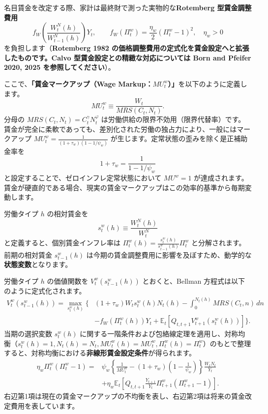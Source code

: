 \documentclass[
  japanese,
  lualatex,
  ja=standard,
  12pt,
  a4paper]{ltjsarticle}
\begin{document}
名目賃金を改定する際、家計は最終財で測った実物的な\textbf{Rotemberg
型賃金調整費用} \[
f_W\left(\frac{W_t^N(h)}{W_{t-1}^N(h)}\right)Y_t,
\qquad
f_W(\Pi_t^w)=\frac{\eta_w}{2}(\Pi_t^w-1)^2,
\quad
\eta_w>0
\] を負担します（\textbf{Rotemberg 1982
の価格調整費用の定式化を賃金設定へと拡張したものです。Calvo
型賃金設定との精緻な対応については Born and Pfeifer 2020, 2025
を参照してください}）。

ここで、\textbf{「賃金マークアップ（Wage
Markup：\(MU_t^w\)）」}を以下のように定義します。 \[
MU_t^w
\equiv
\frac{W_t}{MRS(C_t,N_t)}.
\] 分母の \(MRS(C_t, N_t) = C_t^\gamma N_t^\varphi\)
は労働供給の限界不効用（限界代替率）です。賃金が完全に柔軟であっても、差別化された労働の独占力により、一般にはマークアップ
\(MU_t^w = \frac{1}{(1+\tau_w)(1-1/\psi_w)}\)
が生じます。定常状態の歪みを除く是正補助金率を \[
1+\tau_w=\frac{1}{1-1/\psi_w}
\] と設定することで、ゼロインフレ定常状態において \(MU^w=1\)
が達成されます。賃金が硬直的である場合、現実の賃金マークアップはこの効率的基準から毎期変動します。

労働タイプ \(h\) の相対賃金を \[
s_t^w(h)\equiv \frac{W_t^N(h)}{W_t^N}
\] と定義すると、個別賃金インフレ率は
\(\Pi_t^w(h) = \frac{s_t^w(h)}{s_{t-1}^w(h)}\Pi_t^w\)
と分解されます。前期の相対賃金 \(s_{t-1}^w(h)\)
は今期の賃金調整費用に影響を及ぼすため、動学的な\textbf{状態変数}となります。

労働タイプ \(h\) の価値関数を \(V_t^w(s_{t-1}^w(h))\) とおくと、Bellman
方程式は以下のように定式化されます。 \[
\begin{aligned}
V_t^w(s_{t-1}^w(h))
=
\max_{s_t^w(h)}
\Bigg\{
&
(1+\tau_w)W_t s_t^w(h)N_t(h)
-
\int_0^{N_t(h)}
MRS(C_t,n)\,dn
\\
&
-f_W(\Pi_t^w(h))Y_t
+
\mathbb{E}_t
\left[
Q_{t,t+1}V_{t+1}^w(s_t^w(h))
\right]
\Bigg\}.
\end{aligned}
\] 当期の選択変数 \(s_t^w(h)\)
に関する一階条件および包絡線定理を適用し、対称均衡（\(s_t^w(h)=1, N_t(h)=N_t, MU_t^w(h)=MU_t^w, \Pi_t^w(h)=\Pi_t^w\)）のもとで整理すると、対称均衡における\textbf{非線形賃金設定条件}が得られます。
\[
\begin{aligned}
\eta_w\Pi_t^w(\Pi_t^w-1)
={} &
\psi_w
\left\{
\frac{1}{MU_t^w}
-
(1+\tau_w)\left(1-\frac{1}{\psi_w}\right)
\right\}
\frac{W_tN_t}{Y_t}
\\
&+
\eta_w\mathbb{E}_t
\left[
Q_{t,t+1}
\frac{Y_{t+1}}{Y_t}
\Pi_{t+1}^w(\Pi_{t+1}^w-1)
\right].
\end{aligned}
\]
右辺第1項は現在の賃金マークアップの不均衡を表し、右辺第2項は将来の賃金改定費用を表しています。
\end{document}
